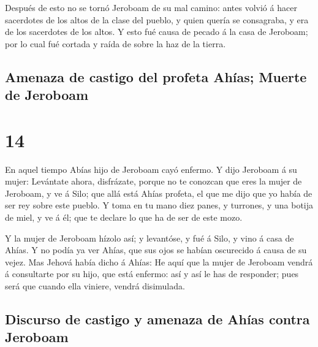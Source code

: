  Después de esto no se tornó Jeroboam de su mal camino:
antes volvió á hacer sacerdotes de los altos de la clase del pueblo, y
quien quería se consagraba, y era de los sacerdotes de los altos.
 Y esto fué causa de pecado á la casa de Jeroboam; por lo
cual fué cortada y raída de sobre la haz de la tierra.

\hypertarget{amenaza-de-castigo-del-profeta-ahuxedas-muerte-de-jeroboam}{%
\subsection{Amenaza de castigo del profeta Ahías; Muerte de
Jeroboam}\label{amenaza-de-castigo-del-profeta-ahuxedas-muerte-de-jeroboam}}

\hypertarget{section-13}{%
\section{14}\label{section-13}}

 En aquel tiempo Abías hijo de Jeroboam cayó enfermo.
 Y dijo Jeroboam á su mujer: Levántate ahora, disfrázate,
porque no te conozcan que eres la mujer de Jeroboam, y ve á Silo; que
allá está Ahías profeta, el que me dijo que yo había de ser rey sobre
este pueblo.  Y toma en tu mano diez panes, y turrones, y
una botija de miel, y ve á él; que te declare lo que ha de ser de este
mozo.

 Y la mujer de Jeroboam hízolo así; y levantóse, y fué á
Silo, y vino á casa de Ahías. Y no podía ya ver Ahías, que sus ojos se
habían oscurecido á causa de su vejez.  Mas Jehová había
dicho á Ahías: He aquí que la mujer de Jeroboam vendrá á consultarte por
su hijo, que está enfermo: así y así le has de responder; pues será que
cuando ella viniere, vendrá disimulada.

\hypertarget{discurso-de-castigo-y-amenaza-de-ahuxedas-contra-jeroboam}{%
\subsection{Discurso de castigo y amenaza de Ahías contra
Jeroboam}\label{discurso-de-castigo-y-amenaza-de-ahuxedas-contra-jeroboam}}

